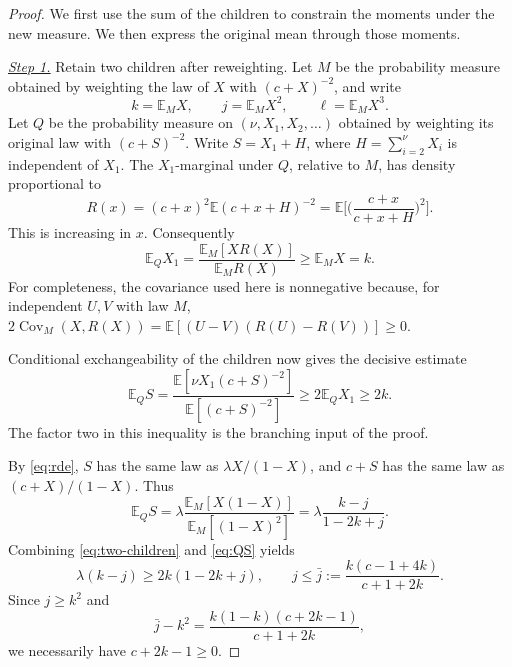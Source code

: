 \documentclass[11pt,a4paper]{article}
\numberwithin{equation}{section}
\theoremstyle{notethm}
\theoremstyle{definition}
\newcommand{\E}{\mathbb E}
\newcommand{\Cov}{\operatorname{Cov}}
\begin{document}
\begin{proof}
We first use the sum of the children to constrain the moments under the
new measure. We then express the original mean through those moments.

\smallskip\noindent
\underline{\textit{Step 1.}} Retain two children after reweighting.
Let $M$ be the probability measure obtained by weighting the law of $X$ with
$(c+X)^{-2}$, and write
\begin{equation}\label{eq:tilted-moments}
 k=\E_MX,\qquad j=\E_MX^2,\qquad \ell=\E_MX^3.
\end{equation}
Let $Q$ be the probability measure on $(\nu,X_1,X_2,\ldots)$ obtained by
weighting its original law with $(c+S)^{-2}$. Write
$S=X_1+H$, where $H=\sum_{i=2}^{\nu}X_i$ is independent of $X_1$.
The $X_1$-marginal under $Q$, relative to $M$, has density proportional to
\begin{equation}\label{eq:tilt-ratio}
 R(x)=(c+x)^2\E(c+x+H)^{-2}
     =\E\biggl[\biggl(\frac{c+x}{c+x+H}\biggr)^2\biggr].
\end{equation}
This is increasing in $x$. Consequently
\begin{equation}\label{eq:first-child}
 \E_QX_1=\frac{\E_M[XR(X)]}{\E_MR(X)}\ge \E_MX=k.
\end{equation}
For completeness, the covariance used here is nonnegative because, for
independent $U,V$ with law $M$,
$2\Cov_M(X,R(X))=\E[(U-V)(R(U)-R(V))]\ge0$.

Conditional exchangeability of the children now gives the decisive estimate
\begin{equation}\label{eq:two-children}
 \boxed{\quad
 \E_QS
 =\frac{\E[\nu X_1(c+S)^{-2}]}{\E[(c+S)^{-2}]}
 \ge2\E_QX_1\ge2k.
 \quad}
\end{equation}
The factor two in this inequality is the branching input of the proof.

By \eqref{eq:rde}, $S$ has the same law as $\lambda X/(1-X)$, and
$c+S$ has the same law as $(c+X)/(1-X)$. Thus
\begin{equation}\label{eq:QS}
 \E_QS=\lambda\frac{\E_M[X(1-X)]}{\E_M[(1-X)^2]}
     =\lambda\frac{k-j}{1-2k+j}.
\end{equation}
Combining \eqref{eq:two-children} and \eqref{eq:QS} yields
\begin{equation}\label{eq:moment-constraint}
 \lambda(k-j)\ge2k(1-2k+j),
 \qquad
 j\le\bar j:=\frac{k(c-1+4k)}{c+1+2k}.
\end{equation}
Since $j\ge k^2$ and
\begin{equation}\label{eq:moment-feasible}
 \bar j-k^2=\frac{k(1-k)(c+2k-1)}{c+1+2k},
\end{equation}
we necessarily have $c+2k-1\ge0$.


\end{proof}
\end{document}
